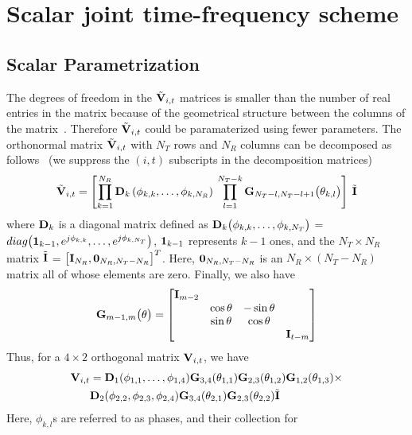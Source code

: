 \documentclass[journal,10pt,twocolumn]{IEEEtran}
\def\bD{{\bf D}}
\def\bG{{\bf G}}
\def\bI{{\bf I}}
\def\bV{{\bf V}}
\begin{document}
\section{Scalar joint time-frequency scheme}
\subsection{Scalar Parametrization}
\label{givens}
The degrees of freedom in the $\tilde{\bV}_{i,t}$ matrices is smaller
than the number of real entries in the matrix because of the
geometrical structure between the columns of the
matrix~\cite{4114278}.  Therefore $\tilde{\bV}_{i,t}$ could be paramaterized
using fewer parameters.
The orthonormal matrix $\tilde{\bV}_{i,t}$ with
$N_T$ rows and $N_R$ columns can be decomposed as
follows~\cite{4114278} (we suppress the $(i, t)$ subscripts in the
decomposition matrices)
\begin{equation}
\tilde{\bV}_{i,t} = \left[\prod_{k=1}^{N_{R}} \bD_{k} \left( \phi_{k,k},\ldots , \phi_{k,N_{R}} \right) \:  \prod_{l=1}^{N_{T}-k} \bG_{N_{T}-l,N_{T} -l+1} \big( \theta_{k,l}\big)  \right] \: \tilde{\bI}
\end{equation}
where $\bD_{k}$ is a diagonal matrix defined as
$\bD_{k}\big(\phi_{k,k}, \ldots, \phi_{k,N_T } \big)$ =
$\mbox{diag}\big( {\bf 1}_{k-1}, e^{j\phi_{k,k}},\ldots,
e^{j\phi_{k,N_T }} \big)$, ${\bf 1}_{k-1}$ represents $k-1$ ones,
and the $N_T \times N_R$ matrix $\tilde{\bI}$ =
$\big[\bI_{N_R }, {\bf 0}_{N_R ,N_T -N_R}\big]^{T}$. Here,
${\bf 0}_{N_R ,N_T -N_R }$ is an $N_R\times (N_T - N_R)$ matrix all of
whose elements are zero. Finally, we also have
\begin{equation}
\bG_{m-1,m}\big(\theta\big)  =
\begin{bmatrix}
\bI_{m-2} & & & \\
& \cos\theta & -\sin\theta & \\
& \sin\theta & \cos\theta & \\
& & & \bI_{t-m}
\end{bmatrix}
\end{equation}
Thus, for a $4 \times 2$ orthogonal matrix $\bV_{i,t}$, we have
\begin{align*}
  \bV_{i,t} & =
  \bD_{1}(\phi_{1,1},\ldots,\phi_{1,4})\bG_{3,4}(\theta_{1,1})
  \bG_{2,3}(\theta_{1,2}) \bG_{1,2}(\theta_{1,3})\times\\
& \bD_{2}(\phi_{2,2},\phi_{2,3},\phi_{2,4}) \bG_{3,4}(\theta_{2,1}) \bG_{2,3}(\theta_{2,2})\tilde{\bI}
\end{align*}
Here, $\phi_{k,l}$s are referred to as phases, and their collection for
\end{document}
